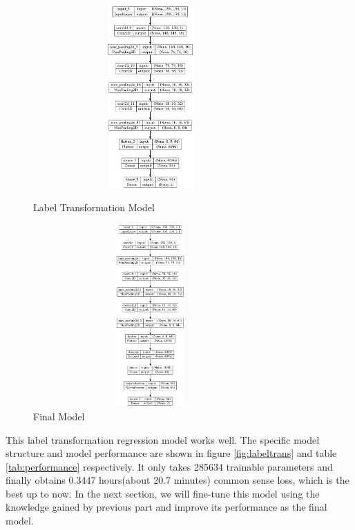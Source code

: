 \documentclass{article}
\begin{document}
\begin{figure}[!h]
	\centering
	\begin{minipage}[t]{0.4\textwidth}%
		\centering
		\includegraphics[width=0.8\textwidth, height=7cm]{./fig/label_model.png}
		\caption{Label Transformation Model}
		\label{fig:labeltrans}
	\end{minipage}
    \hspace{0.8cm}
	\begin{minipage}[t]{0.4\textwidth}%
		\centering
		\includegraphics[width=0.8\textwidth, height=7cm]{./fig/final_model.png}
		\caption{Final Model}
		\label{fig:final}
	\end{minipage}
\end{figure}

This label transformation regression model works well. The specific model structure and model performance are shown in figure \ref{fig:labeltrans} and table \ref{tab:performance} respectively. It only takes 285634 trainable parameters and finally obtains 0.3447 hours(about 20.7 minutes) common sense loss, which is the best up to now. In the next section, we will fine-tune this model using the knowledge gained by previous part and improve its performance as the final model.
\end{document}
